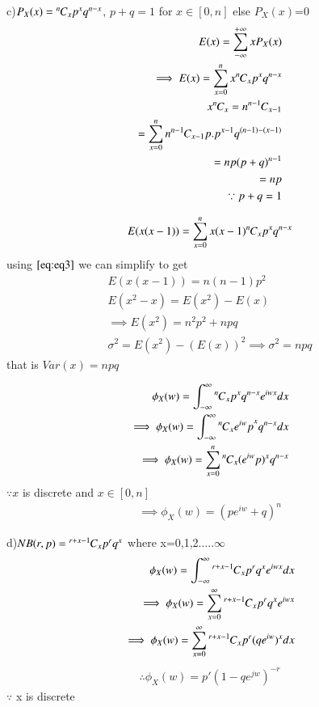 \documentclass{beamer}
\newcommand*{\permcomb}[4][0mu]{{{}^{#3}\mkern#1#2_{#4}}}
\newcommand*{\comb}[1][-1mu]{\permcomb[#1]{C}}
\begin{document}
	\begin{frame}
	c)$P_{X}(x)=\comb{n}{x} p^x q^{n-x}$, $p+q=1$ for  $x\in[0,n]$
	else $P_{X}(x)$=0\\
	\begin{align}
	E(x)=\sum_{-\infty}^{+\infty} xP_{X}(x)\\
	\implies E(x)=\sum_{x=0}^{n} x\comb{n}{x} p^x q^{n-x}\\
	\label{eq:eq3}
	x\comb{n}{x}=n\comb{n-1}{x-1}\\
	=\sum_{x=0}^{n} n \comb{n-1}{x-1} p.p^{x-1} q^{(n-1)-(x-1)}\\
	=np(p+q)^{n-1}\\
	=np\\
	\because p+q=1
	\end{align}
	\end{frame}
	\begin{frame}
	\begin{align}
	E(x(x-1))=\sum_{x=0}^{n} x(x-1)\comb{n}{x} p^x q^{n-x}
	\end{align}
	using $\eqref{eq:eq3}$ we can simplify to get
	\begin{align}
	E(x(x-1))=n(n-1)p^2\\
	E(x^{2}-x)=E(x^2)-E(x)\\
	\implies E(x^2)=n^{2}p^{2}+npq\\
	\sigma ^2=E(x^2)-(E(x))^2
	\implies \sigma ^2=npq
	\end{align}
	that is $Var(x)=npq$
	\end{frame}
	\begin{frame}
	\begin{align}
	\phi_{X}(w)=\int_{-\infty}^{\infty} \comb{n}{x} p^{x} q^{n-x} e^{iwx} dx\\
	\implies \phi_{X}(w)=\int_{-\infty}^{\infty} \comb{n}{x} {e^{iw}p}^{x} q^{n-x} dx\\
	\implies \phi_{X}(w)=\sum_{x=0}^{n} \comb{n}{x} (e^{iw}p)^{x} q^{n-x}
		\end{align}
		$\because x$ is discrete and $x \in [0,n]$
		\begin{align}
	\implies \phi_{X}(w)=(pe^{iw}+q)^n
	\end{align}
	\end{frame}
	\begin{frame}
	d)$NB(r,p)=\comb{r+x-1}{x}p^{r}q^{x}$  where x=0,1,2.....$\infty$
	\begin{align}
	\phi_{X}(w)=\int_{-\infty}^{\infty} \comb{r+x-1}{x} p^{r} q^{x} e^{iwx} dx\\
	\implies \phi_{X}(w)=\sum_{x=0}^{\infty}\comb{r+x-1}{x} p^{r} q^{x} e^{iwx}\\
	\implies \phi_{X}(w)=\sum_{x=0}^{\infty}\comb{r+x-1}{x}p^{r} ({qe^{iw}})^{x} dx
	\end{align}
	\begin{align}
	\therefore \phi_{X}(w)=p'(1-qe^{jw})^{-r}
	\end{align}
$\because $ x is discrete
	\end{frame}
\end{document}
